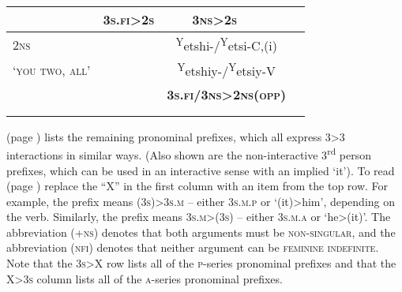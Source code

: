 \begin{table}
\begin{tabular}{lcccc}
& \textbf{{\textsc{3s.fi>2s}}} & \textbf{{\textsc{3ns>2s}}} &  &  \\
\midrule
\textsc{2ns} & & \multicolumn{2}{c}{\textsuperscript{Y}etshi-/\textsuperscript{Y}etsi-C,(i)} & \\
\textsc{`you two, all'} & & \multicolumn{2}{c}{\textsuperscript{Y}etshiy-/\textsuperscript{Y}etsiy-V} & \\
& & \multicolumn{2}{c}{\textbf{\textsc{3s.fi/3ns>2ns(opp)}}} & \\
& & \multicolumn{2}{c}{\textbf{\textsc{}}} & \\
\lspbottomrule
\end{tabular}
\end{table}

\FloatBarrier
{} (page \pageref{figtab:3:3 interactions}) lists the remaining pronominal prefixes, which all express 3>3 interactions in similar ways. (Also shown are the non-interactive 3\textsuperscript{rd} person prefixes, which can be used in an interactive sense with an implied ‘it’). To read  (page \pageref{figtab:3:3 interactions}) replace the “X” in the first column with an item from the top row. For example, the  prefix means \textsc{(3s)>3s.m} -- either \textsc{3s.m.p} or ‘(it)>him’, depending on the verb. Similarly, the  prefix means \textsc{3s.m>(3s)} -- either \textsc{3s.m.a} or ‘he>(it)’. The abbreviation \textsc{(+ns)} denotes that both arguments must be \textsc{non-singular}, and the abbreviation \textsc{(nfi)} denotes that neither argument can be \textsc{feminine indefinite}. Note that the \textsc{3s>X} row lists all of the \textsc{p}-series pronominal prefixes and that the \textsc{X>3s} column lists all of the \textsc{a}-series pronominal prefixes.



